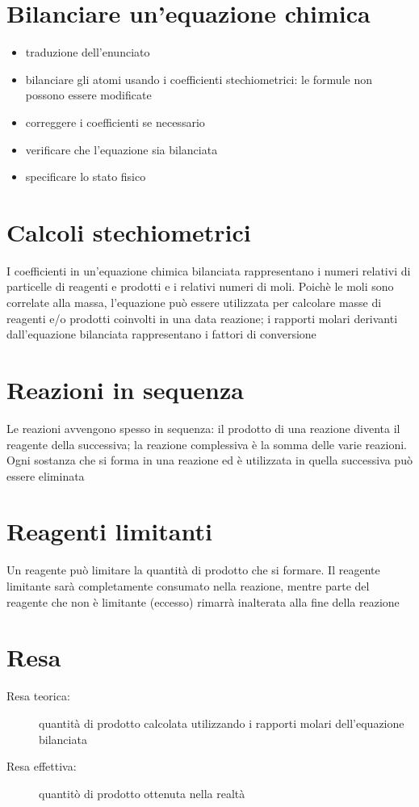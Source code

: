 \documentclass[a4paper,11pt]{report}
\begin{document}
\section{Bilanciare un'equazione chimica}
\begin{itemize}
	\item traduzione dell'enunciato
 \item bilanciare gli atomi usando i coefficienti stechiometrici: le formule non possono essere modificate
 \item correggere i coefficienti se necessario
 \item verificare che l'equazione sia bilanciata
 \item specificare lo stato fisico
\end{itemize}

\section{Calcoli stechiometrici}
I coefficienti in un'equazione chimica bilanciata rappresentano i numeri relativi di particelle di reagenti e prodotti e i relativi numeri di moli. Poichè le moli sono correlate alla massa, l'equazione può essere utilizzata per calcolare masse di reagenti e/o prodotti coinvolti in una data reazione; i rapporti molari derivanti dall'equazione bilanciata rappresentano i fattori di conversione 

\section{Reazioni in sequenza}
Le reazioni avvengono spesso in sequenza: il prodotto di una reazione diventa il reagente della successiva; la reazione complessiva è la somma delle varie reazioni. Ogni sostanza che si forma in una reazione ed è utilizzata in quella successiva può essere eliminata

\section{Reagenti limitanti}
Un reagente può limitare la quantità di prodotto che si formare. Il reagente limitante sarà completamente consumato nella reazione, mentre parte del reagente che non è limitante (eccesso) rimarrà inalterata alla fine della reazione 

\section{Resa}
\begin{description}
	\item[Resa teorica:] quantità di prodotto calcolata utilizzando i rapporti molari dell'equazione bilanciata 
 \item[Resa effettiva:] quantitò di prodotto ottenuta nella realtà
\end{description}
\end{document}
